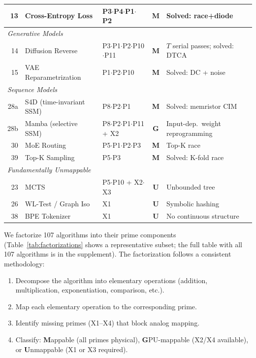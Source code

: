 \documentclass[11pt]{article}
\begin{document}
\begin{table}[t]
\begin{tabular}{rllcl}
13 & Cross-Entropy Loss & P3$\cdot$P4$\cdot$P1$\cdot$P2 & \textbf{M} & Solved: race+diode~\cite{bieg2025} \\
\midrule
\multicolumn{5}{l}{\textit{Generative Models}} \\
14 & Diffusion Reverse & P3$\cdot$P1$\cdot$P2$\cdot$P10$\cdot$P11 & \textbf{M} & $T$ serial passes; solved: DTCA~\cite{extropic2025} \\
15 & VAE Reparametrization & P1$\cdot$P2$\cdot$P10 & \textbf{M} & Solved: DC + noise~\cite{bieg2025} \\
\midrule
\multicolumn{5}{l}{\textit{Sequence Models}} \\
28a & S4D (time-invariant SSM) & P8$\cdot$P2$\cdot$P1 & \textbf{M} & Solved: memristor CIM~\cite{zhang2025ssm} \\
28b & Mamba (selective SSM) & P8$\cdot$P2$\cdot$P1$\cdot$P11 + X2 & \textbf{G} & Input-dep.\ weight reprogramming \\
30 & MoE Routing & P5$\cdot$P1$\cdot$P2$\cdot$P3 & \textbf{M} & Top-K race~\cite{bieg2025} \\
39 & Top-K Sampling & P5$\cdot$P3 & \textbf{M} & Solved: K-fold race~\cite{bieg2026} \\
\midrule
\multicolumn{5}{l}{\textit{Fundamentally Unmappable}} \\
23 & MCTS & P5$\cdot$P10 + X2$\cdot$X3 & \textbf{U} & Unbounded tree \\
26 & WL-Test / Graph Iso & X1 & \textbf{U} & Symbolic hashing \\
38 & BPE Tokenizer & X1 & \textbf{U} & No continuous structure \\
\bottomrule
\end{tabular}
\end{table}

We factorize 107 algorithms into their prime components (Table~\ref{tab:factorizations} shows a representative subset; the full table with all 107 algorithms is in the supplement). The factorization follows a consistent methodology:

\begin{enumerate}[leftmargin=*]
\item Decompose the algorithm into elementary operations (addition, multiplication, exponentiation, comparison, etc.).
\item Map each elementary operation to the corresponding prime.
\item Identify missing primes (X1--X4) that block analog mapping.
\item Classify: \textbf{M}appable (all primes physical), \textbf{G}PU-mappable (X2/X4 available), or \textbf{U}nmappable (X1 or X3 required).
\end{enumerate}
\end{document}
